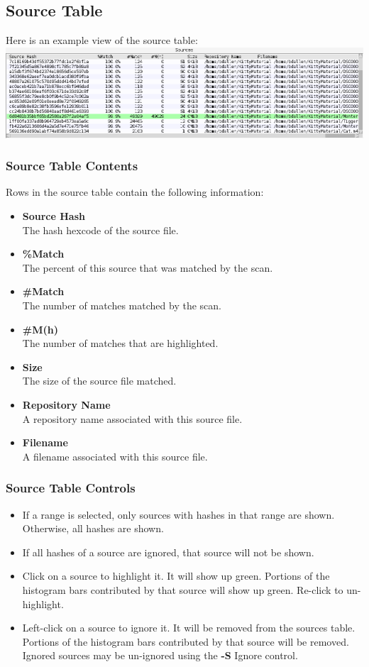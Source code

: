 \documentclass[11pt,fleqn]{article} %
\begin{document}
\subsection{Source Table}
Here is an example view of the source table:\\
\includegraphics[scale=.4]{screenshots/source_table}\\

\subsubsection{Source Table Contents}
Rows in the source table contain the following information:
\begin{itemize}
\item \textbf{Source Hash}\\
The hash hexcode of the source file.
\item \textbf{\%Match}\\
The percent of this source that was matched by the scan.
\item \textbf{\#Match}\\
The number of matches matched by the scan.
\item \textbf{\#M(h)}\\
The number of matches that are highlighted.
\item \textbf{Size}\\
The size of the source file matched.
\item \textbf{Repository Name}\\
A repository name associated with this source file.
\item \textbf{Filename}\\
A filename associated with this source file.
\end{itemize}

\subsubsection{Source Table Controls}
\begin{itemize}
\item If a range is selected, only sources with hashes in that range are shown. Otherwise, all hashes are shown.
\item If all hashes of a source are ignored, that source will not be shown.
\item Click on a source to highlight it. It will show up green. Portions of the histogram bars contributed  by that source will show up green. Re-click to un-highlight.
\item Left-click on a source to ignore it. It will be removed from the sources table. Portions of the histogram bars contributed  by that source will be removed. Ignored sources may be un-ignored using the \textbf{-S} Ignore control.
\end{itemize}
\end{document}
